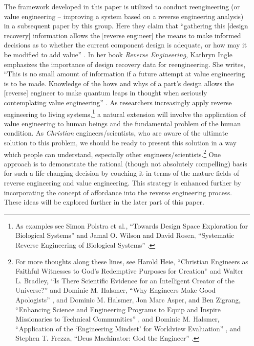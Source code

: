 The framework developed in this paper is utilized to conduct
reengineering (or value engineering – improving a system based on a
reverse engineering analysis) in a subsequent paper by this group. Here
they claim that ``gathering this [design recovery] information allows
the [reverse engineer] the means to make informed decisions as to
whether the current component design is adequate, or how may it be
modified to add value'' \citep[][p.~166]{urbanicelmaraghy2009b}. In her 
book \textit{Reverse Engineering}, Kathryn Ingle emphasizes the importance of design
recovery data for reengineering. She writes, “This is no small amount
of information if a future attempt at value engineering is to be made.
Knowledge of the hows and whys of a part’s design allows the [reverse]
engineer to make quantum leaps in thought when seriously contemplating
value engineering” \citep[][pp. 65--66]{ingle1994}. As researchers increasingly
apply reverse engineering to living systems,\footnote{
As examples see Simon Polstra et al., “Towards
Design Space Exploration for Biological Systems” \citep{polstraetal2008}
and Jamal O. Wilson and David Rosen,
“Systematic Reverse Engineering of Biological Systems” \citep{wilsonrosen2007}.
} a
natural extension will involve the application of value engineering to
human beings and the fundamental problem of the human condition. As
\textit{Christian} engineers/scientists, who are aware of the ultimate
solution to this problem, we should be ready to present this solution
in a way which people can understand, especially other
engineers/scientists.\footnote{
For more thoughts along these lines, see Harold
Heie, “Christian Engineers as Faithful Witnesses to God’s Redemptive
Purposes for Creation” \citep{heie1999}
and Walter L. Bradley,
“Is There Scientific Evidence for an Intelligent Creator of the
Universe?” \citep{bradley2003}
and Dominic M. Halsmer, “Why Engineers Make Good Apologists” \citep{halsmer2007},
 and Dominic M. Halsmer, Jon Marc Asper, and Ben Zigrang,
“Enhancing Science and Engineering Programs to Equip and Inspire
Missionaries to Technical Communities” \citep{halsmeretal2011},
and Dominic M. Halsmer,
“Application of the ‘Engineering Mindset’ for Worldview Evaluation” \citep{halsmer2009},
and Stephen T. Frezza, “Deus Machinator: God the Engineer” \citep{frezza2009}.
} One approach is to
demonstrate the rational (though not absolutely compelling) basis for
such a life-changing decision by couching it in terms of the mature
fields of reverse engineering and value engineering. This strategy is
enhanced further by incorporating the concept of affordance into the
reverse engineering process. These ideas will be explored further in
the later part of this paper.

